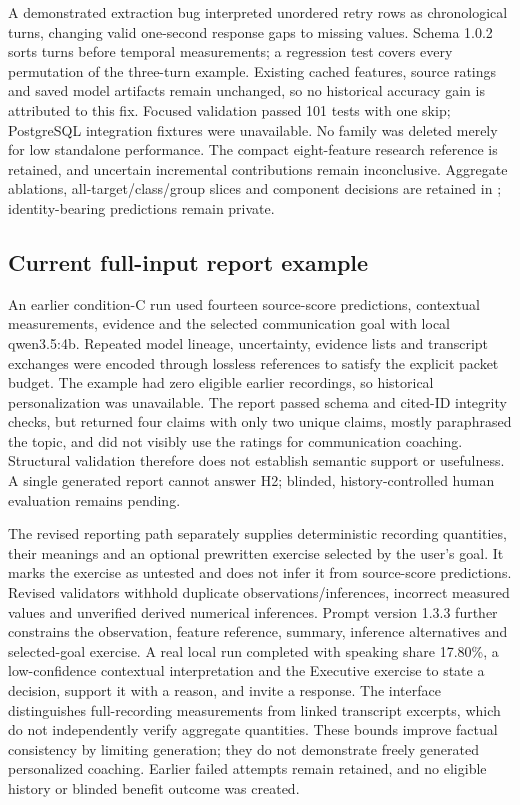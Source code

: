 \documentclass{article}
\begin{document}
A demonstrated extraction bug interpreted unordered retry rows as chronological turns, changing valid one-second response gaps to missing values. Schema 1.0.2 sorts turns before temporal measurements; a regression test covers every permutation of the three-turn example. Existing cached features, source ratings and saved model artifacts remain unchanged, so no historical accuracy gain is attributed to this fix. Focused validation passed 101 tests with one skip; PostgreSQL integration fixtures were unavailable. No family was deleted merely for low standalone performance. The compact eight-feature research reference is retained, and uncertain incremental contributions remain inconclusive. Aggregate ablations, all-target/class/group slices and component decisions are retained in ; identity-bearing predictions remain private.

\subsection{Current full-input report example}
An earlier condition-C run used fourteen source-score predictions, contextual measurements, evidence and the selected communication goal with local qwen3.5:4b. Repeated model lineage, uncertainty, evidence lists and transcript exchanges were encoded through lossless references to satisfy the explicit packet budget. The example had zero eligible earlier recordings, so historical personalization was unavailable. The report passed schema and cited-ID integrity checks, but returned four claims with only two unique claims, mostly paraphrased the topic, and did not visibly use the ratings for communication coaching. Structural validation therefore does not establish semantic support or usefulness. A single generated report cannot answer H2; blinded, history-controlled human evaluation remains pending.


The revised reporting path separately supplies deterministic recording quantities, their meanings and an optional prewritten exercise selected by the user's goal. It marks the exercise as untested and does not infer it from source-score predictions. Revised validators withhold duplicate observations/inferences, incorrect measured values and unverified derived numerical inferences. Prompt version 1.3.3 further constrains the observation, feature reference, summary, inference alternatives and selected-goal exercise. A real local run completed with speaking share 17.80\%, a low-confidence contextual interpretation and the Executive exercise to state a decision, support it with a reason, and invite a response. The interface distinguishes full-recording measurements from linked transcript excerpts, which do not independently verify aggregate quantities. These bounds improve factual consistency by limiting generation; they do not demonstrate freely generated personalized coaching. Earlier failed attempts remain retained, and no eligible history or blinded benefit outcome was created.
\end{document}
